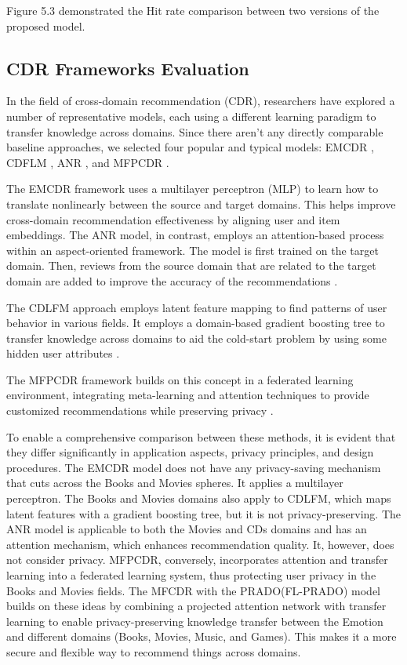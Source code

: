 Figure  5.3 demonstrated the Hit rate comparison between two versions of the proposed model.

\subsection{CDR Frameworks Evaluation}
In the field of cross-domain recommendation (CDR), researchers have explored a number of representative models, each using a different learning paradigm to transfer knowledge across domains. Since there aren't any directly comparable baseline approaches, we selected four popular and typical models: EMCDR \cite{ref86}, CDFLM \cite{ref87}, ANR \cite{ref88}, and MFPCDR \cite{ref89}.

The EMCDR framework uses a multilayer perceptron (MLP) to learn how to translate nonlinearly between the source and target domains. This helps improve cross-domain recommendation effectiveness by aligning user and item embeddings. The ANR model, in contrast, employs an attention-based process within an aspect-oriented framework. The model is first trained on the target domain. Then, reviews from the source domain that are related to the target domain are added to improve the accuracy of the recommendations \cite{ref87} .

The CDLFM approach employs latent feature mapping to find patterns of user behavior in various fields. It employs a domain-based gradient boosting tree to transfer knowledge across domains to aid the cold-start problem by using some hidden user attributes \cite{ref88}.

The MFPCDR framework builds on this concept in a federated learning environment, integrating meta-learning and attention techniques to provide customized recommendations while preserving privacy \cite{ref89}.

To enable a comprehensive comparison between these methods, it is evident that they differ significantly in application aspects, privacy principles, and design procedures. The EMCDR model does not have any privacy-saving mechanism that cuts across the Books and Movies spheres. It applies a multilayer perceptron. The Books and Movies domains also apply to CDLFM, which maps latent features with a gradient boosting tree, but it is not privacy-preserving. The ANR model is applicable to both the Movies and CDs domains and has an attention mechanism, which enhances recommendation quality. It, however, does not consider privacy. MFPCDR, conversely, incorporates attention and transfer learning into a federated learning system, thus protecting user privacy in the Books and Movies fields.  The MFCDR with the PRADO(FL-PRADO) model builds on these ideas by combining a projected attention network with transfer learning to enable privacy-preserving knowledge transfer between the Emotion and different domains (Books, Movies, Music, and Games). This makes it a more secure and flexible way to recommend things across domains.

